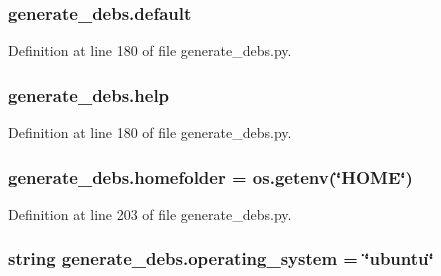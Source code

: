 \subsubsection[{\texorpdfstring{default}{default}}]{\setlength{\rightskip}{0pt plus 5cm}generate\+\_\+debs.\+default}\hypertarget{namespacegenerate__debs_a3d67a92b7eb3a59c397dc9fdd1c67558}{}\label{namespacegenerate__debs_a3d67a92b7eb3a59c397dc9fdd1c67558}


Definition at line 180 of file generate\+\_\+debs.\+py.

\subsubsection[{\texorpdfstring{help}{help}}]{\setlength{\rightskip}{0pt plus 5cm}generate\+\_\+debs.\+help}\hypertarget{namespacegenerate__debs_ab09f4294da5036d5f6881672de9ed9c7}{}\label{namespacegenerate__debs_ab09f4294da5036d5f6881672de9ed9c7}


Definition at line 180 of file generate\+\_\+debs.\+py.

\subsubsection[{\texorpdfstring{homefolder}{homefolder}}]{\setlength{\rightskip}{0pt plus 5cm}generate\+\_\+debs.\+homefolder = os.\+getenv(\char`\"{}H\+O\+ME\char`\"{})}\hypertarget{namespacegenerate__debs_aeb83979be2939a8059435a906a91f682}{}\label{namespacegenerate__debs_aeb83979be2939a8059435a906a91f682}


Definition at line 203 of file generate\+\_\+debs.\+py.

\subsubsection[{\texorpdfstring{operating\+\_\+system}{operating_system}}]{\setlength{\rightskip}{0pt plus 5cm}string generate\+\_\+debs.\+operating\+\_\+system = \char`\"{}ubuntu\char`\"{}}\hypertarget{namespacegenerate__debs_a162df833915546009650658683731f94}{}\label{namespacegenerate__debs_a162df833915546009650658683731f94}


